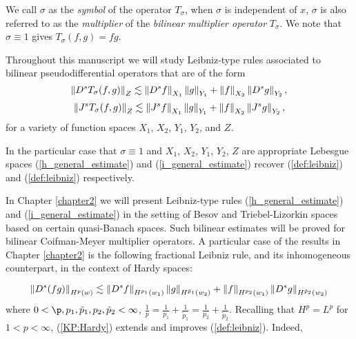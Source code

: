 We call $\sigma$ as the \textit{symbol} of the operator $T_\sigma$, when $\sigma$ is independent of $x$, $\sigma$ is also referred to as the \textit{multiplier} of the \textit{bilinear multiplier operator} $T_\sigma$. We note that $\sigma \equiv 1$ gives $T_\sigma(f,g) = fg$. 


Throughout this manuscript we will study Leibniz-type rules associated to bilinear pseudodifferential operators that are of the form 
\begin{equation}\label{h_general_estimate}
\left\|D^s T_\sigma(f,g)\right\|_{Z} \lesssim \left\|D^sf\right\|_{X_1}\left\|g\right\|_{Y_1} + \left\|f\right\|_{X_2}\left\|D^s g\right\|_{Y_2} ,
\end{equation}
\begin{equation}\label{i_general_estimate}
\left\|J^sT_\sigma(f,g)\right\|_{Z} \lesssim \left\|J^sf\right\|_{X_1}\left\|g\right\|_{Y_1} + \left\|f\right\|_{X_2}\left\|J^sg\right\|_{Y_2} ,
\end{equation}
for a variety of function spaces $X_1$, $X_2$, $Y_1$, $Y_2$, and $Z$.



In the particular case that $\sigma \equiv 1$ and $X_1$, $X_2$, $Y_1$, $Y_2$, $Z$ are appropriate Lebesgue spaces (\ref{h_general_estimate}) and (\ref{i_general_estimate}) recover (\ref{def:leibniz}) and (\ref{def:leibniz}) respectively.

In Chapter \ref{chapter2} we will present Leibniz-type rules (\ref{h_general_estimate}) and (\ref{i_general_estimate}) in the setting of Besov and Triebel-Lizorkin spaces based on certain quasi-Banach spaces. Such bilinear estimates will be proved for bilinear Coifman-Meyer multiplier operators. A particular case of the results in Chapter \ref{chapter2} is the following fractional Leibniz rule, and its inhomogeneous counterpart, in the context of Hardy spaces:

\begin{equation}\label{KP:Hardy}
\left\|D^s(fg)\right\|_{H^p(w)} \lesssim \left\|D^s f\right\|_{H^{p_1}(w_1)} \left\|g\right\|_{H^{\tilde{p}_1}(w_2)} +  \left\|f\right\|_{H^{p_2}(w_1)}   \left\|D^s g\right\|_{H^{\tilde{p}_2}(w_2)} 
\end{equation}
where $0<\p,p_1,\tilde{p}_1, p_2, \tilde{p}_2 <\infty$, $\frac{1}{p} = \frac{1}{p_1} + \frac{1}{\tilde{p}_1} = \frac{1}{p_2} + \frac{1}{\tilde{p}_2}$. Recalling that $H^p = L^p$ for $1<p<\infty$, (\ref{KP:Hardy}) extends and improves (\ref{def:leibniz}). Indeed, 

